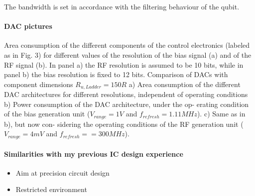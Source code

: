 \documentclass[a4paper,12pt]{article} %
\begin{document}
The bandwidth is set in accordance with the filtering behaviour of the qubit.


\paragraph{DAC pictures}
Area consumption of the different components of the
control electronics (labeled as in Fig. 3) for different values of
the resolution of the bias signal (a) and of the RF signal (b).
In panel a) the RF resolution is assumed to be 10 bits, while
in panel b) the bias resolution is fixed to 12 bits.
Comparison of DACs with component dimensions
 $R_{u,Ladder} = 150R$
a) Area consumption of the different DAC architectures for
different resolutions, independent of operating conditions b)
Power consumption of the DAC architecture, under the op-
erating condition of the bias generation unit ($V_{range} = 1 V$
and $f_{refresh} = 1.11 MHz$). c) Same as in b), but now con-
sidering the operating conditions of the RF generation unit
($V_{range} = 4 mV$ and $f_{refresh} = = 300 MHz$).

\paragraph{Similarities with my previous IC design experience}
\begin{itemize}
    \item Aim at precision circuit design
    \item Restricted environment
\end{itemize}
\end{document}
